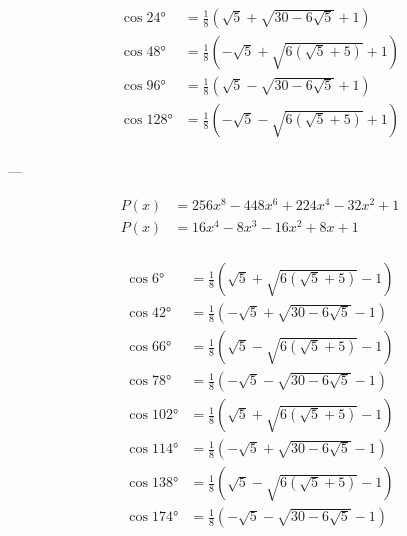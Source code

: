 $$
\begin{aligned}
    \cos 24°  &= \frac{1}{8} \left(\sqrt{5}+\sqrt{30-6 \sqrt{5}}+1\right)\\
    \cos 48°  &= \frac{1}{8} \left(-\sqrt{5}+\sqrt{6 \left(\sqrt{5}+5\right)}+1\right)\\
    \cos 96°  &= \frac{1}{8} \left(\sqrt{5}-\sqrt{30-6 \sqrt{5}}+1\right)\\
    \cos 128° &= \frac{1}{8} \left(-\sqrt{5}-\sqrt{6 \left(\sqrt{5}+5\right)}+1\right)\\
\end{aligned}
$$

---

$$
\begin{aligned}
    P(x) &= 256 x^8-448 x^6+224 x^4-32 x^2+1\\
    P(x) &= 16 x^4-8 x^3-16 x^2+8 x+1\\
\end{aligned}
$$

$$
\begin{aligned}
    \cos 6°   &= \frac{1}{8} \left(\sqrt{5}+\sqrt{6 \left(\sqrt{5}+5\right)}-1\right)\\
    \cos 42°  &= \frac{1}{8} \left(-\sqrt{5}+\sqrt{30-6 \sqrt{5}}-1\right)\\
    \cos 66°  &= \frac{1}{8} \left(\sqrt{5}-\sqrt{6 \left(\sqrt{5}+5\right)}-1\right)\\
    \cos 78°  &= \frac{1}{8} \left(-\sqrt{5}-\sqrt{30-6 \sqrt{5}}-1\right)\\
    \cos 102° &= \frac{1}{8} \left(\sqrt{5}+\sqrt{6 \left(\sqrt{5}+5\right)}-1\right)\\
    \cos 114° &= \frac{1}{8} \left(-\sqrt{5}+\sqrt{30-6 \sqrt{5}}-1\right)\\
    \cos 138° &= \frac{1}{8} \left(\sqrt{5}-\sqrt{6 \left(\sqrt{5}+5\right)}-1\right)\\
    \cos 174° &= \frac{1}{8} \left(-\sqrt{5}-\sqrt{30-6 \sqrt{5}}-1\right)\\
\end{aligned}
$$